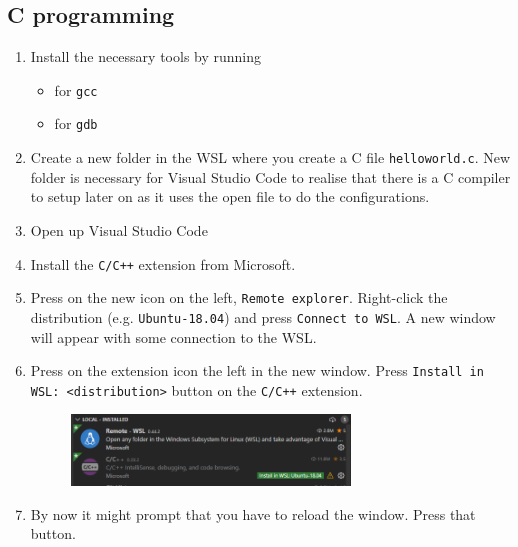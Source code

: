 \subsection{C programming}

\begin{enumerate}
    \item Install the necessary tools by running
    \begin{itemize}
        \item {} for \texttt{gcc}
        \item {} for \texttt{gdb}
    \end{itemize}

    \item Create a new folder in the WSL where you create a C file \texttt{helloworld.c}. New folder is necessary for Visual Studio Code to realise that there is a C compiler to setup later on as it uses the open file to do the configurations.
    
    \item Open up Visual Studio Code
    
    \item Install the \texttt{C/C++} extension from Microsoft.
    
    \item Press on the new icon on the left, \texttt{Remote explorer}. Right-click the distribution (e.g. \texttt{Ubuntu-18.04}) and press \texttt{Connect to WSL}. A new window will appear with some connection to the WSL.
    
    \item Press on the extension icon the left in the new window. Press \texttt{Install in WSL: <distribution>} button on the \texttt{C/C++} extension.
    
    \begin{figure}[H]
        \centering
        \includegraphics[width=0.7\textwidth]{figures/vscode_extensions.PNG}
    \end{figure}
    
    \item By now it might prompt that you have to reload the window. Press that button.


\end{enumerate}
